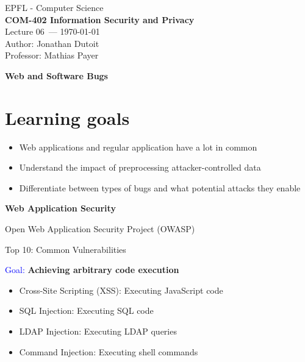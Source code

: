 \documentclass[11pt]{article}
\newcommand{\coursename}{COM-402 Information Security and Privacy}
\newcommand{\lecturenum}{06}
\newcommand{\lecturedate}{\today}
\newcommand{\professor}{Mathias Payer}
\begin{document}
\begin{center}
  {\large EPFL - Computer Science} \\[0.5em]
  {\Large \textbf{\coursename}} \\[0.5em]
  {\large Lecture \lecturenum\ --- \lecturedate} \\[0.5em]
  {\large Author: Jonathan Dutoit} \\[0.5em]
  {\large Professor: \professor} \\[0.5em]
\end{center}

\vspace{2cm}

\begin{center}
  {\LARGE \textbf{Web and Software Bugs}}
\end{center}

\vspace{0.5cm}

\section*{Learning goals}
\begin{itemize}
	\item Web applications and regular application have a lot in common
	\item Understand the impact of preprocessing attacker-controlled data
	\item Differentiate between types of bugs and what potential attacks they enable
\end{itemize}

\vspace{0.5cm}

\vspace{0.5cm}

\begin{center}
  {\LARGE \textbf{Web Application Security}}
\end{center}
\vspace{0.5cm}

Open Web Application Security Project (OWASP)

Top 10: Common Vulnerabilities 

\textcolor{blue}{Goal: }\textbf{Achieving arbitrary code execution}
\begin{itemize}
	\item Cross-Site Scripting (XSS): Executing JavaScript code
	\item SQL Injection: Executing SQL code
	\item LDAP Injection: Executing LDAP queries
	\item Command Injection: Executing shell commands
\end{itemize}
\end{document}
